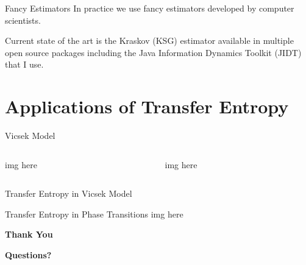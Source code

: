 \documentclass{cubeamer}
\begin{document}
\begin{frame}{Fancy Estimators}
    In practice we use fancy estimators developed by computer scientists.
    
    Current state of the art is the Kraskov (KSG) estimator available in multiple open source packages including the Java Information Dynamics Toolkit (JIDT) that I use.
\end{frame}

\section{Applications of Transfer Entropy}

\begin{frame}{Vicsek Model}
    \begin{columns}
        \begin{column}{0.5\textwidth}
            img here
        \end{column}
        \begin{column}{0.5\textwidth}
            img here
        \end{column}
    \end{columns}
\end{frame}

\begin{frame}{Transfer Entropy in Vicsek Model}
\end{frame}

\begin{frame}{Transfer Entropy in Phase Transitions}
    img here
\end{frame}
    

\begin{frame}[standout]
    \centering
    \Huge\textbf{Thank You}
    
    \vfill
    
    \LARGE\textbf{Questions?}
\end{frame}
\end{document}
